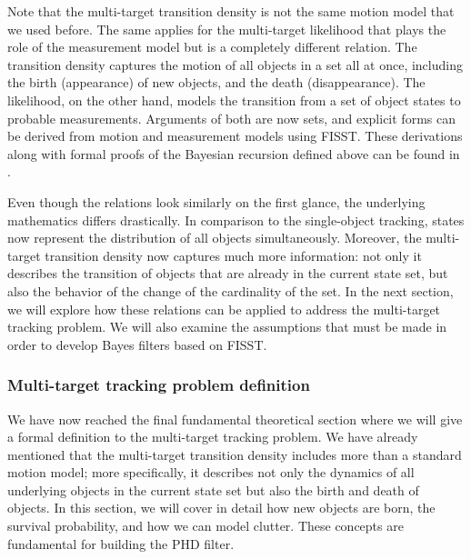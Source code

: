 Note that the multi-target transition density is not the same motion model that we used before. The same applies for the multi-target likelihood that plays the role of the measurement model but is a completely different relation. The transition density captures the motion of all objects in a set all at once, including the birth (appearance) of new objects, and the death (disappearance). The likelihood, on the other hand, models the transition from a set of object states to probable measurements. Arguments of both are now sets, and explicit forms can be derived from motion and measurement models using FISST. These derivations along with formal proofs of the Bayesian recursion defined above can be found in \cite{mahlerMultitargetBayesFiltering2003}.

Even though the relations look similarly on the first glance, the underlying mathematics differs drastically. In comparison to the single-object tracking, states now represent the distribution of all objects simultaneously. Moreover, the multi-target transition density now captures much more information: not only it describes the transition of objects that are already in the current state set, but also the behavior of the change of the cardinality of the set. In the next section, we will explore how these relations can be applied to address the multi-target tracking problem. We will also examine the assumptions that must be made in order to develop Bayes filters based on FISST.

\subsubsection{Multi-target tracking problem definition}

We have now reached the final fundamental theoretical section where we will give a formal definition to the multi-target tracking problem. We have already mentioned that the multi-target transition density includes more than a standard motion model; more specifically, it describes not only the dynamics of all underlying objects in the current state set but also the birth and death of objects. In this section, we will cover in detail how new objects are born, the survival probability, and how we can model clutter. These concepts are fundamental for building the PHD filter.

